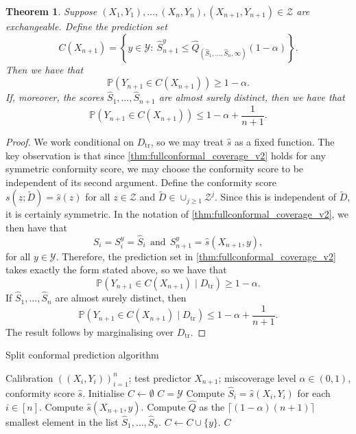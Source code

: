 \documentclass[11pt, titlepage]{article} %
\newcommand{\Prob}[1]{\mathbb{P}\left( #1 \right)}
\numberwithin{equation}{section}
\newtheorem{theorem}{Theorem}
\theoremstyle{definition}
\numberwithin{theorem}{section}
\numberwithin{lemma}{section}
\numberwithin{corollary}{section}
\numberwithin{proposition}{section}
\numberwithin{definition}{section}
\numberwithin{remark}{section}
\begin{document}
\begin{theorem}
    Suppose \((X_1, Y_1), \ldots, (X_n, Y_n), (X_{n+1}, Y_{n+1}) \in \mathcal{Z}\) are exchangeable. Define the prediction set \[
        C(X_{n+1}) = \left\{ y \in \mathcal{Y}: \  \hat{S}_{n+1}^y \leq \hat{Q}_{(\hat{S}_1, \ldots, \hat{S}_n, \infty)}(1-\alpha)  \right\}.
    \] Then we have that \[\Prob{Y_{n+1} \in C(X_{n+1})} \geq 1-\alpha.\] If, moreover, the scores \(\hat{S}_1, \ldots, \hat{S}_{n+1}\) are almost surely distinct, then we have that \[\Prob{Y_{n+1} \in C(X_{n+1})} \leq 1-\alpha + \frac{1}{n+1}.\]
\label{thm:splitconformal_coverage}
\end{theorem}
\begin{proof}
    We work conditional on \(D_\mathrm{tr}\), so we may treat \(\hat{s}\) as a fixed function. The key observation is that since \cref{thm:fullconformal_coverage_v2} holds for any symmetric conformity score, we may choose the conformity score to be independent of its second argument. Define the conformity score \(s(z; \tilde{D}) = \hat{s}(z)\) for all \(z \in \mathcal{Z}\) and \(\tilde{D} \in \cup_{j \geq 1} \mathcal{Z}^j\). Since this is independent of \(\tilde{D}\), it is certainly symmetric. In the notation of \cref{thm:fullconformal_coverage_v2}, we then have that \[S_i = S_i^y = \hat{S}_i \ \ \mathrm{and} \ \ S_{n+1}^y = \hat{s}(X_{n+1}, y),\] for all \(y \in \mathcal{Y}\). Therefore, the prediction set in \cref{thm:fullconformal_coverage_v2} takes exactly the form stated above, so we have that \[\Prob{Y_{n+1} \in C(X_{n+1}) \mid D_{\mathrm{tr}}  } \geq 1-\alpha.\] If \(\hat{S}_1, \ldots, \hat{S}_n\) are almost surely distinct, then \[\Prob{Y_{n+1} \in C(X_{n+1}) \mid D_{\mathrm{tr}}  } \leq 1-\alpha + \frac{1}{n+1}.\] The result follows by marginalising over \(D_\mathrm{tr}.\)
\end{proof}

\begin{algorithm}[H]
\caption{Split conformal prediction algorithm}
\begin{algorithmic}
    \Require Calibration \(((X_i, Y_i))_{i=1}^n\); test predictor \(X_{n+1}\); miscoverage level \(\alpha \in (0,1)\), conformity score \(\hat{s}\).
    \State Initialise \(C \gets \emptyset\)
        \State \(C = \mathcal{Y}\)
    \Else
        \State Compute \(\hat{S}_i = \hat{s}(X_i,Y_i)\) for each \(i \in [n]\).
            \State Compute \(\hat{s}(X_{n+1}, y)\).
            \State Compute \(\hat{Q}\) as the \(\lceil (1-\alpha)(n+1) \rceil \) smallest element in the list \(\hat{S}_1, \ldots, \hat{S}_n\).
                \State \(C \gets C \cup \{y\} \).
            \EndIf   
        \EndFor
    \EndIf
    \Ensure \(C\)
\end{algorithmic}
\label{alg:split_conformal}
\end{algorithm}
\end{document}
